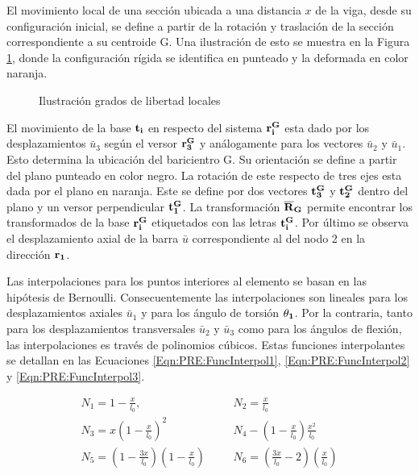 El movimiento local de una sección ubicada a una distancia $x$ de la viga, desde su configuración inicial, se define a partir de la rotación y traslación de la sección correspondiente a su centroide G. Una ilustración de esto se muestra en la Figura \ref{fig:PRE:IlusLocal}, donde la configuración rígida se identifica en punteado y la deformada en color naranja.

\begingroup
\begin{figure}[htbp]
	\centering
	\label{fig:PRE:IlusLocalDisp}
	\label{fig:PRE:IlusLocalAng}
	\caption{Ilustración grados de libertad locales} 	\label{fig:PRE:IlusLocal}
\end{figure}
\endgroup

El movimiento de la base $\bf{t_i}$ en respecto del sistema $\bf{r_i^G}$ esta dado por los desplazamientos  $\bar{u}_3$ según el versor  $\bf{r_3^G}$ y análogamente para los vectores $\bar{u}_2$ y $\bar{u}_1$. Esto determina la ubicación del baricientro G. Su orientación se define a partir del plano punteado en color negro. La rotación de este respecto de tres ejes esta dada por el plano en naranja. Este se define por dos vectores $\bf{t_3^G}$ y $\bf{t_2^G}$ dentro del plano y un versor perpendicular $\bf{t_1^G}$. La transformación $\bf{\overline{R}}_G$ permite encontrar  los transformados de la base $\bf{r_i^G}$ etiquetados con las letras $\bf{t_i^G}$. Por último se observa el desplazamiento axial de la barra $\bar{u}$ correspondiente al del nodo 2 en la dirección $\bf{r_1}$.

Las interpolaciones para los puntos interiores al elemento se basan en las hipótesis de Bernoulli. Consecuentemente las interpolaciones son lineales para los desplazamientos axiales $\bar{u}_1$ y para los ángulo de torsión $\bf{\theta_1}$. Por la contraria, tanto para los desplazamientos transversales $\bar{u}_2$ y $\bar{u}_3$  como para los ángulos de flexión, las interpolaciones es través de polinomios cúbicos. Estas funciones interpolantes se detallan en las Ecuaciones \eqref{Eqn:PRE:FuncInterpol1}, \ref{Eqn:PRE:FuncInterpol2} y \eqref{Eqn:PRE:FuncInterpol3}.

\begin{eqnarray}
		\label{Eqn:PRE:FuncInterpol1}
 		N_1 = 1 - \frac{x}{l_0},   		&~~~~& 	N_2= \frac{x}{l_0}\\
 		\label{Eqn:PRE:FuncInterpol2}
 		N_3 = x\left(1 - \frac{x}{l_0}\right)^2 	&~~~~&  N_4 - \left( 1 - \frac{x}{l_0} \right ) \frac{x^2}{l_0} \\
 		\label{Eqn:PRE:FuncInterpol3}
 		N_5 = \left(1 - \frac{3x}{l_0}\right) \left(1 - \frac{x}{l_0}\right) 	&~~~~&  N_6 =\left( \frac{3x}{l_0}-2\right) \left(\frac{x}{l_0}\right)
\end{eqnarray}

